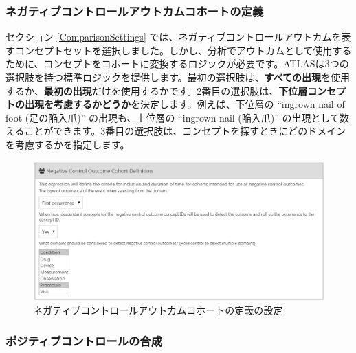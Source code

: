 \documentclass[
  11pt]{book}
\theoremstyle{definition}
\theoremstyle{definition}
\theoremstyle{definition}
\theoremstyle{definition}
\theoremstyle{remark}
\begin{document}
\subsubsection*{ネガティブコントロールアウトカムコホートの定義}\label{ux30cdux30acux30c6ux30a3ux30d6ux30b3ux30f3ux30c8ux30edux30fcux30ebux30a2ux30a6ux30c8ux30abux30e0ux30b3ux30dbux30fcux30c8ux306eux5b9aux7fa9}

セクション \ref{ComparisonSettings} では、ネガティブコントロールアウトカムを表すコンセプトセットを選択しました。しかし、分析でアウトカムとして使用するために、コンセプトをコホートに変換するロジックが必要です。ATLASは3つの選択肢を持つ標準ロジックを提供します。最初の選択肢は、\textbf{すべての出現}を使用するか、\textbf{最初の出現}だけを使用するかです。2番目の選択肢は、\textbf{下位層コンセプトの出現を考慮するかどうか}を決定します。例えば、下位層の ``ingrown nail of foot (足の陥入爪)'' の出現も、上位層の ``ingrown nail (陥入爪)'' の出現として数えることができます。3番目の選択肢は、コンセプトを探すときにどのドメインを考慮するかを指定します。

\begin{figure}

{\centering \includegraphics[width=1\linewidth]{images/PopulationLevelEstimation/ncSettings} 

}

\caption{ネガティブコントロールアウトカムコホートの定義の設定}\label{fig:ncSettings}
\end{figure}

\subsubsection*{ポジティブコントロールの合成}\label{ux30ddux30b8ux30c6ux30a3ux30d6ux30b3ux30f3ux30c8ux30edux30fcux30ebux306eux5408ux6210}
\end{document}
